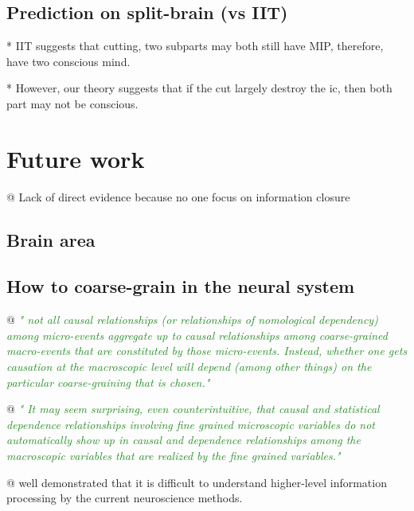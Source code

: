 \documentclass[utf8]{article}
\newenvironment{ants}
			{
			 \begin{easylist}[itemize]
			}
			{
			\end{easylist}
			}
\newcommand{\rewrite}[1]{\textcolor{ForestGreen}{\textit{"#1"}}\newline}
\begin{document}
			
		
		\subsection{Prediction on split-brain (vs IIT)}
			* IIT suggests that cutting, two subparts may both still have MIP, therefore, have two conscious mind. 
			
			* However, our theory suggests that if the cut largely destroy the \ac{ic}, then both part may not be conscious. 
	
	
	

	
	
	
	\section{Future work}
		\begin{ants}
			
			@ Lack of direct evidence because no one focus on information closure
			
		\end{ants}
	
		\subsection{Brain area}
		\subsection{How to coarse-grain in the neural system}
			\begin{ants}
				@ \rewrite{
					not all causal relationships (or relationships of nomological dependency) among micro-events aggregate up to causal relationships among coarse-grained macro-events that are constituted by those micro-events. Instead, whether one gets causation at the macroscopic level will depend (among other things) on the particular coarse-graining that is chosen.} \cite{price2007causation}
				
				@ \rewrite{
					It may seem surprising, even counterintuitive, that causal and statistical dependence relationships involving fine grained microscopic variables do not automatically show up in causal and dependence relationships among the macroscopic variables that are realized by the fine grained variables.} \cite{price2007causation}
				
				@ \cite{jonas2017could} well demonstrated that it is difficult to understand higher-level information processing by the current neuroscience methods. 
				
			\end{ants}
	
\end{document}
